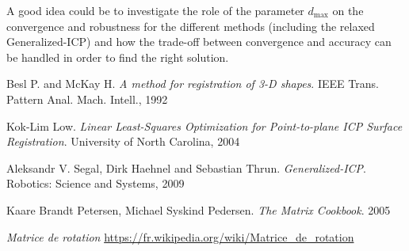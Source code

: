 \documentclass[11pt,letterpaper,leqno]{article}
\begin{document}
A good idea could be to investigate the role of the parameter $d_{\text{max}}$ on the convergence and robustness for the different methods (including the relaxed Generalized-ICP) and how the trade-off between convergence and accuracy can be handled in order to find the right solution.

\break

\begin{thebibliography}{9}

    Besl P. and McKay H.
    \textit{A method for registration of 3-D shapes}. 
    IEEE Trans. Pattern Anal. Mach. Intell., 1992

    Kok-Lim Low.
    \textit{Linear Least-Squares Optimization for
    \textit{Point-to-plane} ICP Surface Registration}. 
    University of North Carolina, 2004

    Aleksandr V. Segal, Dirk Haehnel and Sebastian Thrun.
    \textit{Generalized-ICP}. 
    Robotics: Science and Systems, 2009

    Kaare Brandt Petersen, Michael Syskind Pedersen.
    \textit{The Matrix Cookbook}. 2005

    \textit{Matrice de rotation} \url{https://fr.wikipedia.org/wiki/Matrice_de_rotation}

\end{thebibliography}
\end{document}
